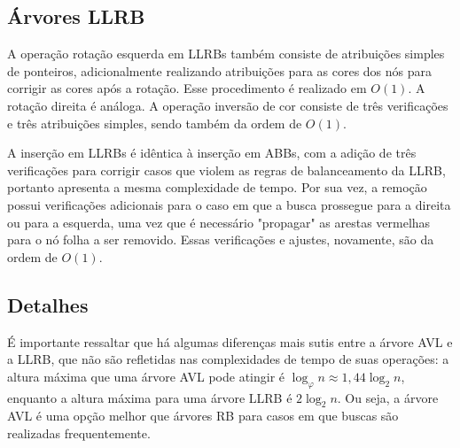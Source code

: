 \documentclass[a4paper,12pt]{report}
\begin{document}
\subsection*{Árvores LLRB}

A operação rotação esquerda em LLRBs também consiste de atribuições simples de ponteiros,
adicionalmente realizando atribuições para as cores dos nós para corrigir as cores após a
rotação. Esse procedimento é realizado em $O(1)$. A rotação direita é análoga. A operação
inversão de cor consiste de três verificações e três atribuições simples, sendo também da
ordem de $O(1)$.

A inserção em LLRBs é idêntica à inserção em ABBs, com a adição de três verificações
para corrigir casos que violem as regras de balanceamento da LLRB, portanto apresenta
a mesma complexidade de tempo. Por sua vez, a remoção possui verificações adicionais 
para o caso em que a busca prossegue para a direita ou para a esquerda, uma vez que é
necessário "propagar" as arestas vermelhas para o nó folha a ser removido. Essas 
verificações e ajustes, novamente, são da ordem de $O(1)$.

\subsection*{Detalhes}

É importante ressaltar que há algumas diferenças mais sutis entre a árvore AVL e a LLRB,
que não são refletidas nas complexidades de tempo de suas operações: a altura máxima que
uma árvore AVL pode atingir é $\log_{\varphi} n \approx 1{,}44 \log_2 n$, enquanto 
a altura máxima para uma árvore LLRB é $2 \log_2 n$. Ou seja, a árvore AVL é uma 
opção melhor que árvores RB para casos em que buscas são realizadas frequentemente.

\printbibliography
\end{document}
